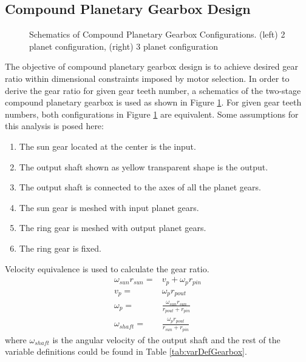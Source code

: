 \subsection{\textbf{Compound Planetary Gearbox Design}}
\label{sec:compoundGearBox}

\begin{figure}
	\centering
	\caption{Schematics of Compound Planetary Gearbox Configurations. (left) 2 planet configuration, (right) 3 planet configuration}
	\label{fig:planetaryGearbox}
\end{figure}

The objective of compound planetary gearbox design is to achieve desired gear ratio within dimensional constraints imposed by motor selection. In order to derive the gear ratio for given gear teeth number, a schematics of the two-stage compound planetary gearbox is used as shown in Figure \ref{fig:planetaryGearbox}. For given gear teeth numbers, both configurations in Figure \ref{fig:planetaryGearbox} are equivalent. Some assumptions for this analysis is posed here: 

\begin{enumerate}
	\item The sun gear located at the center is the input.
	\item The output shaft shown as yellow transparent shape is the output.
	\item The output shaft is connected to the axes of all the planet gears.
	\item The sun gear is meshed with input planet gears.
	\item The ring gear is meshed with output planet gears.
	\item The ring gear is fixed.
\end{enumerate}

Velocity equivalence is used to calculate the gear ratio.
\begin{eqnarray}
\omega_{sun} r_{sun} =& v_p + \omega_p r_{pin}\\
v_p =& \omega_{p} r_{pout}\\
\omega_p =& \frac{\omega_{sun}r_{sun}}{r_{pout}+r_{pin}}\\
\omega_{shaft} =& \frac{\omega_{p}r_{pout}}{r_{sun}+r_{pin}}
\end{eqnarray}
where $\omega_{shaft}$ is the angular velocity of the output shaft and the rest of the variable definitions could be found in Table \ref{tab:varDefGearbox}.

